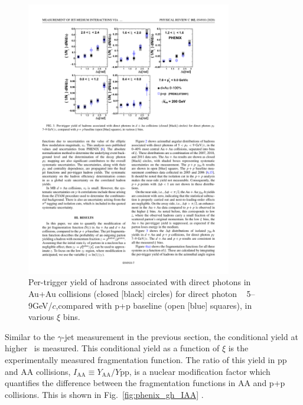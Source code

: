 \begin{figure}[htpb]
  \centering
  \includegraphics[width=0.8\textwidth]{Introduction/phenix_gh_corr.pdf}
  \caption{Per-trigger yield of hadrons associated with direct photons in Au+Au collisions (closed [black] circles) for direct photon \pT~ 5–9GeV/$c$,compared with p+p baseline (open [blue] squares), in various $\xi$ bins.}
  \label{fig:phenix_gh_corr}
\end{figure}

Similar to the $\gamma$-jet measurement in the previous section, the conditional yield at higher \deltaphi~is measured. This conditional yield as a function of $\xi$ is the experimentally measured fragmentation function. The ratio of this yield in pp and AA collisions, $I_\mathrm{AA} \equiv Y_\mathrm{AA}/Y\mathrm{pp}$, is a nuclear modification factor which quantifies the difference between the fragmentation functions in AA and p+p collisions. This is shown in Fig.~\ref{fig:phenix_gh_IAA} \cite{PHENIXCollaboration2020}. 

